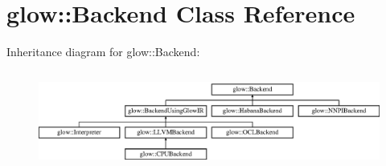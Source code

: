 \hypertarget{classglow_1_1_backend}{}\section{glow\+:\+:Backend Class Reference}
\label{classglow_1_1_backend}
Inheritance diagram for glow\+:\+:Backend\+:\begin{figure}[H]
\begin{center}
\leavevmode
\includegraphics[height=3.274854cm]{classglow_1_1_backend}
\end{center}
\end{figure}
